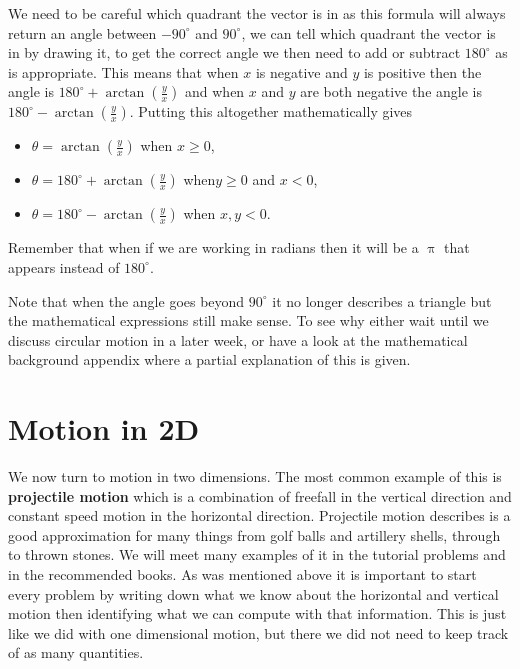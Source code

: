 \documentclass[a4paper,12pt]{book}
\begin{document}
We need to be careful which quadrant the vector is in as this formula will always return an angle between $-90^{\circ}$ and $90^{\circ}$, we can tell which quadrant the vector is in by drawing it, to get the correct angle we then need to add or subtract $180^{\circ}$ as is appropriate. This means that when $x$ is negative and $y$ is positive then the angle is $180^{\circ}+\arctan\left(\frac{y}{x}\right)$ and when $x$ and $y$ are both negative the angle is $180^{\circ}-\arctan\left(\frac{y}{x}\right)$. Putting this altogether mathematically gives
\begin{itemize}
\setlength{\itemsep}{-5pt}
    \item $\theta =\arctan\left(\frac{y}{x}\right) $ when $x\geq 0$,
    \item $\theta =180^{\circ}+\arctan\left(\frac{y}{x}\right) $ when$y\geq 0$ and $x<0$,
    \item $\theta =180^{\circ}-\arctan\left(\frac{y}{x}\right) $ when $x,y <0$.
\end{itemize}
Remember that when if we are working in radians then it will be a $\uppi$ that appears instead of $180^{\circ}$.

Note that when the angle goes beyond $90^{\circ}$ it no longer describes a triangle but the mathematical expressions still make sense. To see why either wait until we discuss circular motion in a later week, or have a look at the mathematical background appendix where a partial explanation of this is given.


\section{Motion in 2D}
We now turn to motion in two dimensions. The most common example of this is \textbf{projectile motion} which is a combination of freefall in the vertical direction and constant speed motion in the horizontal direction.  Projectile motion describes is a good approximation for many things from golf balls and artillery shells, through to thrown stones. We will meet many examples of it in the tutorial problems and in the recommended books. As was mentioned above it is important to start every problem by writing down what we know about the horizontal and vertical motion then identifying what we can compute with that information. This is just like we did with one dimensional motion, but there we did not need to keep track of as many quantities.
\end{document}

